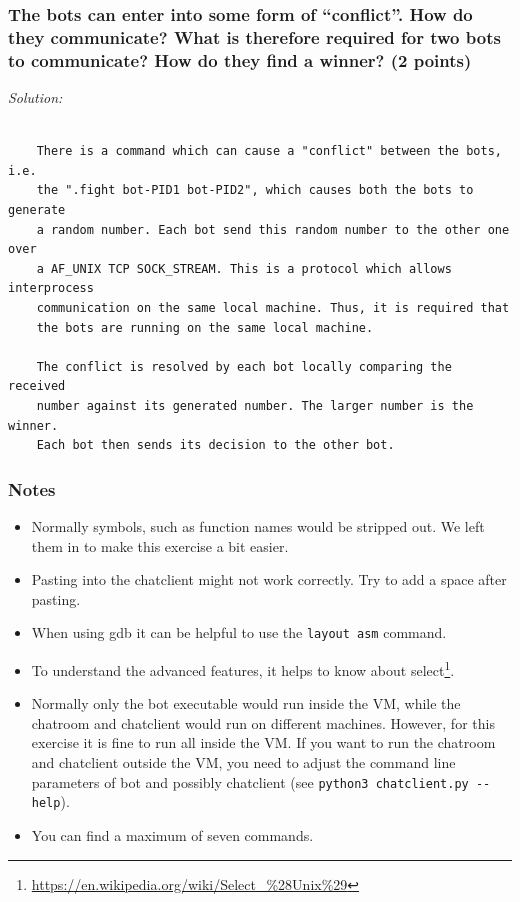 \documentclass[a4paper,11pt]{article}
\newenvironment{solution}%
{\par{\noindent\small\textit{Solution:}}\vspace{-12pt}\begin{framed}}%
{\end{framed}\par}
\begin{document}
\subsubsection*{The bots can enter into some form of ``conflict''. How do they
communicate? What is therefore required for two bots to communicate? How do they
find a winner? \ifsolution (2 points) \fi}

\ifsolution
\begin{solution}
\begin{verbatim}
    
    There is a command which can cause a "conflict" between the bots, i.e.
    the ".fight bot-PID1 bot-PID2", which causes both the bots to generate
    a random number. Each bot send this random number to the other one over
    a AF_UNIX TCP SOCK_STREAM. This is a protocol which allows interprocess
    communication on the same local machine. Thus, it is required that
    the bots are running on the same local machine.
    
    The conflict is resolved by each bot locally comparing the received
    number against its generated number. The larger number is the winner.
    Each bot then sends its decision to the other bot.
\end{verbatim}
\end{solution}\fi



\subsubsection*{Notes}
\begin{itemize}
\item Normally symbols, such as function names would be stripped out. We left
them in to make this exercise a bit easier.
\item Pasting into the chatclient might not work correctly. Try to add a space
after pasting.
\item When using gdb it can be helpful to use the \verb|layout asm| command.
\item To understand the advanced features, it helps to know about
select\footnote{\url{https://en.wikipedia.org/wiki/Select_\%28Unix\%29}}.
\item Normally only the bot executable would run inside the VM, while the
chatroom and chatclient would run on different machines. However, for this
exercise it is fine to run all inside the VM. If you want to run the chatroom
and chatclient outside the VM, you need to adjust the command line parameters of
bot and possibly chatclient (see \verb|python3 chatclient.py --help|).
\item You can find a maximum of seven commands.
\end{itemize}
\end{document}
